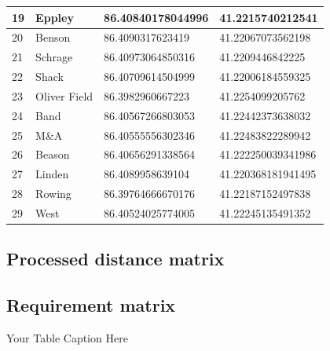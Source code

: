 \documentclass[11pt]{article}
\begin{document}
\begin{table}[H]
\begin{tabular}{|l|l|l|l|}
19    & Eppley         & 86.40840178044996 & 41.2215740212541   \\ \hline
20    & Benson         & 86.4090317623419  & 41.22067073562198  \\ \hline
21    & Schrage        & 86.40973064850316 & 41.2209446842225   \\ \hline
22    & Shack          & 86.40709614504999 & 41.22006184559325  \\ \hline
23    & Oliver Field   & 86.3982960667223  & 41.2254099205762   \\ \hline
24    & Band           & 86.40567266803053 & 41.22442373638032  \\ \hline
25    & M\&A           & 86.40555556302346 & 41.22483822289942  \\ \hline
26    & Beason         & 86.40656291338564 & 41.222250039341986 \\ \hline
27    & Linden         & 86.4089958639104  & 41.220368181941495 \\ \hline
28    & Rowing         & 86.39764666670176 & 41.22187152497838  \\ \hline
29    & West           & 86.40524025774005 & 41.22245135491352  \\ \hline
\end{tabular}
\end{table} 
\newpage
\subsection{Processed distance matrix}
\newpage
\subsection{Requirement matrix}
\begin{table}[ht]
\centering
{} 
\caption{Your Table Caption Here}
\end{table}
\end{document}
